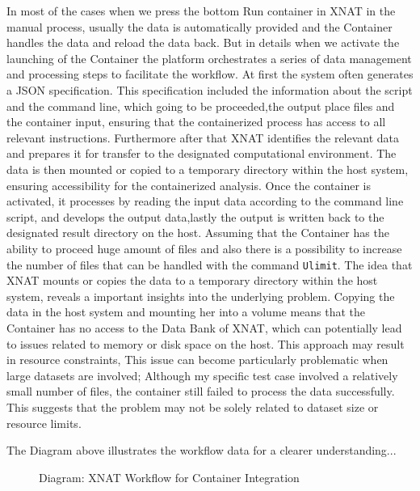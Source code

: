 In most of the cases when we press the bottom Run container in XNAT in the manual process, usually the data is automatically provided and the Container handles the data and reload the data back.
But in details when we activate the launching of the Container the platform orchestrates a series of data management and processing steps to facilitate the workflow. At first the system often generates a JSON specification. This specification included the information about the script and the command line, which going to be proceeded,the output place files and the container input, ensuring that the containerized process has access to all relevant instructions. Furthermore after that XNAT identifies the relevant data and prepares it for transfer to the designated computational environment. The data is then mounted or copied to a temporary directory within the host system, ensuring accessibility for the containerized analysis. Once the container is activated, it processes by reading the input data according to the command line script, and develops the output data,lastly the output is written back to the designated result directory on the host. 
Assuming  that the Container has the ability to proceed huge amount of files and also there is a possibility to increase the number of files that can be handled  with the command \texttt{Ulimit}. 
The idea that XNAT mounts or copies the data to a temporary directory within the host system, reveals a important insights into the underlying problem. Copying the data in the host system and mounting her into a volume means that the Container has no access to the Data Bank of XNAT, which can potentially lead to issues related to memory or disk space on the host. This approach may result in resource constraints, This issue can become particularly problematic when large datasets are involved; Although my specific test case involved a relatively small number of files, the container still failed to process the data successfully. This suggests that the problem may not be solely related to dataset size or resource limits.

The Diagram above illustrates the workflow data for a clearer understanding...\\


\begin{figure}[ht]
    \centering
    \def\svgwidth{\linewidth} 
    
    \caption{Diagram: XNAT Workflow for Container Integration}
    \label{fig:workflowxnat}
\end{figure}



